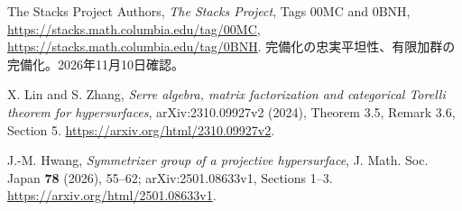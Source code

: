 The Stacks Project Authors,
\emph{The Stacks Project}, Tags 00MC and 0BNH,
\url{https://stacks.math.columbia.edu/tag/00MC},
\url{https://stacks.math.columbia.edu/tag/0BNH}.
完備化の忠実平坦性、有限加群の完備化。2026年11月10日確認。

X. Lin and S. Zhang,
\emph{Serre algebra, matrix factorization and categorical Torelli theorem for hypersurfaces},
arXiv:2310.09927v2 (2024), Theorem 3.5, Remark 3.6, Section 5.
\url{https://arxiv.org/html/2310.09927v2}.

J.-M. Hwang,
\emph{Symmetrizer group of a projective hypersurface},
J. Math. Soc. Japan \textbf{78} (2026), 55--62;
arXiv:2501.08633v1, Sections 1--3.
\url{https://arxiv.org/html/2501.08633v1}.
